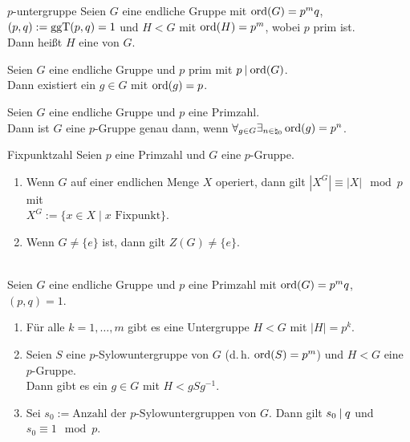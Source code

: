\begin{Def}{$p$-untergruppe}
    Seien $G$ eine endliche Gruppe mit $\operatorname{ord}(G) = p^m q$,\\
    $(p, q) := \operatorname{ggT}(p, q) = 1$
    und $H < G$ mit $\operatorname{ord}(H) = p^m$, wobei $p$ prim ist.\\
    Dann heißt $H$ eine  von $G$.
\end{Def}

\begin{Theorem}{}
    Seien $G$ eine endliche Gruppe und $p$ prim mit $p \mathbin{|} \operatorname{ord}(G)$.\\
    Dann existiert ein $g \in G$ mit $\operatorname{ord}(g) = p$.
\end{Theorem}

\begin{Kor}
    Seien $G$ eine endliche Gruppe und $p$ eine Primzahl.\\
    Dann ist $G$ eine $p$-Gruppe genau dann, wenn
    $\forall_{g \in G} \exists_{n \in \natural_0} \operatorname{ord}(g) = p^n$.
\end{Kor}

\linie

\begin{Prop}{Fixpunktzahl}
    Seien $p$ eine Primzahl und $G$ eine $p$-Gruppe.
    \begin{enumerate}[label=(\alph*)]
        \item
        Wenn $G$ auf einer endlichen Menge $X$ operiert, dann gilt
        $|X^G| \equiv |X| \mod p$ mit\\
        $X^G := \{x \in X \;|\; x \text{ Fixpunkt}\}$.

        \item
        Wenn $G \not= \{e\}$ ist, dann gilt $Z(G) \not= \{e\}$.
    \end{enumerate}
\end{Prop}

\linie

\begin{Theorem}{}\\
    Seien $G$ eine endliche Gruppe und $p$ eine Primzahl mit
    $\operatorname{ord}(G) = p^m q$, $(p, q) = 1$.
    \begin{enumerate}[label=(\alph*)]
        \item
        Für alle $k = 1, \dotsc, m$ gibt es eine Untergruppe $H < G$
        mit $|H| = p^k$.

        \item
        Seien $S$ eine $p$-Sylowuntergruppe von $G$ (d.\,h. $\operatorname{ord}(S) = p^m$)
        und $H < G$ eine $p$-Gruppe.\\
        Dann gibt es ein $g \in G$ mit $H < gSg^{-1}$.

        \item
        Sei $s_0 := \text{Anzahl der } p\text{-Sylowuntergruppen von } G$.
        Dann gilt $s_0 \mathbin{|} q$ und $s_0 \equiv 1 \mod p$.
    \end{enumerate}
\end{Theorem}

